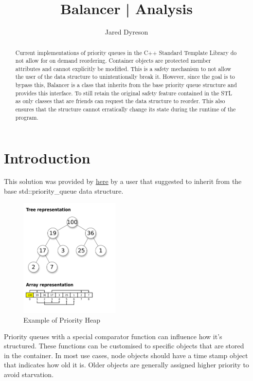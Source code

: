 \documentclass{article}
\title{Balancer | Analysis}
\author{Jared Dyreson}
\begin{document}
\maketitle
\tableofcontents

\newpage

\begin{abstract}
Current implementations of priority queues in the C++ Standard Template Library do not allow for on demand reordering.
Container objects are protected member attributes and cannot explicitly be modified.
This is a safety mechanism to not allow the user of the data structure to unintentionally break it.
However, since the goal is to bypass this, Balancer is a class that inherits from the base priority queue structure and provides this interface.
To still retain the original safety feature contained in the STL as only classes that are friends can request the data structure to reorder.
This also ensures that the structure cannot erratically change its state during the runtime of the program.
\end{abstract}

\section{Introduction}

\begin{flushleft}

This solution was provided by \href{https://stackoverflow.com/questions/5810190/how-to-tell-a-stdpriority-queue-to-refresh-its-ordering}{\underline{here}} by a user that suggested to inherit from the base std::priority_queue data structure.

\begin{figure}[!h]
\centering
\includegraphics[width=5cm]{Max-Heap}
\caption{Example of Priority Heap}
\end{figure}

Priority queues with a special comparator function can influence how it's structured.
These functions can be customised to specific objects that are stored in the container.
In most use cases, node objects should have a time stamp object that indicates how old it is.
Older objects are generally assigned higher priority to avoid starvation.
\end{flushleft}
\end{document}
